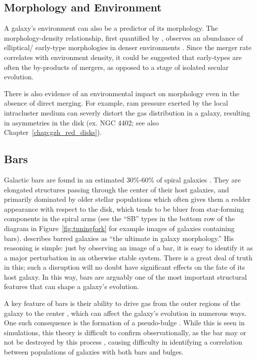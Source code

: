 \subsection{Morphology and Environment}

A galaxy's environment can also be a predictor of its morphology. The morphology-density relationship, first quantified by \citet{Dressler1980}, observes an abundance of elliptical/ early-type morphologies in denser environments \citep{deSouza1982,Postman1984}. Since the merger rate correlates with environment density, it could be suggested that early-types are often the by-products of mergers, as opposed to a stage of isolated secular evolution. 

There is also evidence of an environmental impact on morphology even in the absence of direct merging. For example, ram pressure \citep{Gunn1972} exerted by the local intracluster medium can severly distort the gas distribution in a galaxy, resulting in asymmetries in the disk (ex. NGC 4402; see also Chapter~\ref{chap:gzh_red_disks}).  

\subsection{Bars}

Galactic bars are found in an estimated 30\%-60\% of spiral galaxies \citep{Sellwood1993}. They are elongated structures passing through the center of their host galaxies, and primarily dominated by older stellar populations \citep{Eskridge2002} which often gives them a redder appearance with respect to the disk, which tends to be bluer from star-forming components in the spiral arms (see the ``SB'' types in the bottom row of the diagram in Figure~\ref{fig:tuningfork} for example images of galaxies containing bars). \citet{Buta2013} describes barred galaxies as ``the ultimate in galaxy morphology.'' His reasoning is simple: just by observing an image of a bar, it is easy to identify it as a major perturbation in an otherwise stable system. There is a great deal of truth in this; such a disruption will no doubt have significant effects on the fate of its host galaxy. In this way, bars are arguably one of the most important structural features that can shape a galaxy's evolution. 

A key feature of bars is their ability to drive gas from the outer regions of the galaxy to the center \citep{Athanassoula1992,Friedli1993,Sellwood1993,Shlosman1989,Ann2005}, which can affect the galaxy's evolution in numerous ways. One such consequence is the formation of a pseudo-bulge \citep{Kormendy2004,Sheth2005}. While this is seen in simulations, this theory is difficult to confirm observationally, as the bar may or not be destroyed by this process \citep{Athanassoula2005}, causing difficulty in identifying a correlation between populations of galaxies with both bars and bulges. 

